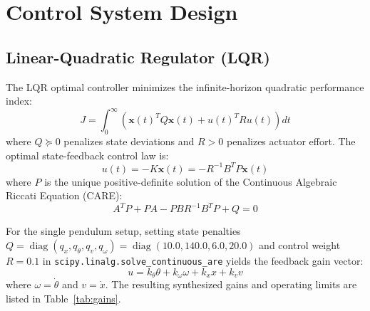 \documentclass[conference]{IEEEtran}
\begin{document}
\section{Control System Design}

\subsection{Linear-Quadratic Regulator (LQR)}
The LQR optimal controller minimizes the infinite-horizon quadratic performance index:
\begin{equation}
J = \int_0^\infty \left( \mathbf{x}(t)^T Q \mathbf{x}(t) + u(t)^T R u(t) \right) dt
\end{equation}
where $Q \succeq 0$ penalizes state deviations and $R > 0$ penalizes actuator effort. The optimal state-feedback control law is:
\begin{equation}
u(t) = -K \mathbf{x}(t) = -R^{-1} B^T P \mathbf{x}(t)
\end{equation}
where $P$ is the unique positive-definite solution of the Continuous Algebraic Riccati Equation (CARE):
\begin{equation}
A^T P + P A - P B R^{-1} B^T P + Q = 0
\label{eq:care}
\end{equation}

For the single pendulum setup, setting state penalties $Q = \operatorname{diag}(q_x, q_\theta, q_v, q_\omega) = \operatorname{diag}(10.0, 140.0, 6.0, 20.0)$ and control weight $R = 0.1$ in \texttt{scipy.linalg.solve\_continuous\_are} yields the feedback gain vector:
\begin{equation}
u = k_\theta \theta + k_\omega \omega + k_x x + k_v v
\label{eq:lqr_formula}
\end{equation}
where $\omega = \dot{\theta}$ and $v = \dot{x}$. The resulting synthesized gains and operating limits are listed in Table~\ref{tab:gains}.
\end{document}
